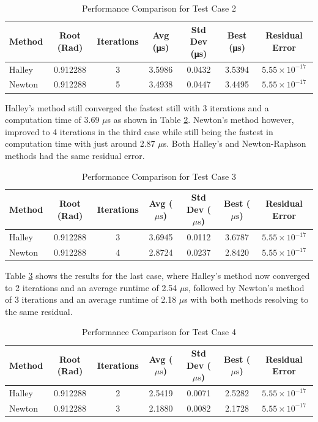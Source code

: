 \documentclass[a4paper,11pt]{article}
\begin{document}
\begin{table}[H]
    \centering
    \caption{Performance Comparison for Test Case 2}
    \label{tab:test-case-2}
    \vspace{2mm}
    \begin{tabular}{l c c c c c c}
        \toprule
        Method & Root (Rad) & Iterations & Avg (\si{\micro\second}) & Std Dev (\si{\micro\second}) & Best (\si{\micro\second}) & Residual Error \\
        \midrule
        Halley      & 0.912288 & 3  & 3.5986 & 0.0432 & 3.5394 & $5.55 \times 10^{-17}$ \\
        Newton      & 0.912288 & 5  & 3.4938 & 0.0447 & 3.4495 & $5.55 \times 10^{-17}$ \\
        \bottomrule
    \end{tabular}
\end{table}

Halley's method still converged the fastest still with 3 iterations and a computation time of 3.69 $\mu$s as shown in Table \ref{tab:test-case-3}. Newton's method however, improved to 4 iterations in the third case while still being the fastest in computation time with just around 2.87 $\mu$s. Both Halley's and Newton-Raphson methods had the same residual error.


\begin{table}[h]
    \centering
    \caption{Performance Comparison for Test Case 3}
    \label{tab:test-case-3}
    \begin{tabular}{l c c c c c c}
        \toprule
        Method & Root (Rad) & Iterations & Avg ($\mu\text{s}$) & Std Dev ($\mu\text{s}$) & Best ($\mu\text{s}$) & Residual Error \\
        \midrule
        Halley      & 0.912288 & 3  & 3.6945 & 0.0112 & 3.6787 & $5.55 \times 10^{-17}$ \\
        Newton      & 0.912288 & 4  & 2.8724 & 0.0237 & 2.8420 & $5.55 \times 10^{-17}$ \\
        \bottomrule
    \end{tabular}
\end{table}
Table \ref{tab:test-case-4} shows the results for the last case, where Halley's method now converged to 2 iterations and an average runtime of 2.54 $\mu$s, followed by Newton's method of 3 iterations and an average runtime of 2.18 $\mu$s with both methods resolving to the same residual.
\begin{table}[h]
    \centering
    \caption{Performance Comparison for Test Case 4}
    \label{tab:test-case-4}
    \begin{tabular}{l c c c c c c}
        \toprule
        Method & Root (Rad) & Iterations & Avg ($\mu\text{s}$) & Std Dev ($\mu\text{s}$) & Best ($\mu\text{s}$) & Residual Error \\
        \midrule
        Halley      & 0.912288 & 2  & 2.5419 & 0.0071 & 2.5282 & $5.55 \times 10^{-17}$ \\
        Newton      & 0.912288 & 3  & 2.1880 & 0.0082 & 2.1728 & $5.55 \times 10^{-17}$ \\
        \bottomrule
    \end{tabular}
\end{table}
\end{document}
